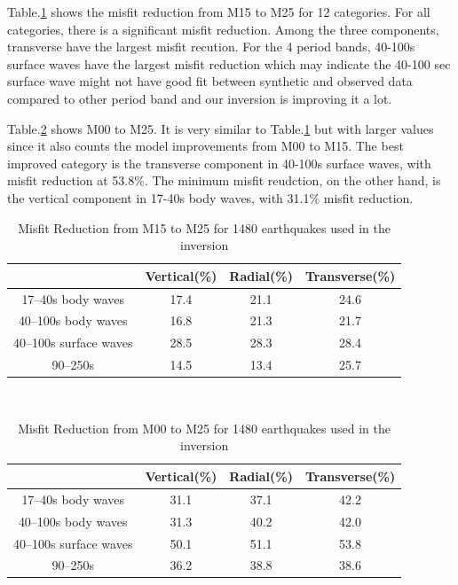 \documentclass[extra,mreferee]{gji}
\begin{document}
Table.\ref{table:misfit_reduction_M15_M25} shows the misfit reduction from M15 to M25
for 12 categories. For all categories, there is a significant misfit reduction. Among
the three components, transverse have the largest misfit recution. For the 4 period bands,
40-100s surface waves have the largest misfit reduction which may indicate the 40-100 sec
surface wave might not have good fit between synthetic and observed data compared to
other period band and our inversion is improving it a lot.

Table.\ref{table:misfit_reduction_M00_M25} shows M00 to M25. It is very similar to
Table.\ref{table:misfit_reduction_M15_M25} but with larger values since it also
counts the model improvements from M00 to M15. The best improved category is
the transverse component in 40-100s surface waves, with misfit reduction at
53.8\%. The minimum misfit reudction, on the other hand, is the vertical component
in 17-40s body waves, with 31.1\% misfit reduction.

\begin{table}[!htb]
  \centering
  \begin{tabular}{|c|c|c|c|}
    \hline
    ~          &  Vertical(\%) & Radial(\%) &  Transverse(\%) \\
    \hline
    17--40s  body waves    &   17.4   &       21.1 &       24.6 \\
    40--100s body waves    &   16.8   &       21.3 &       21.7 \\
    40--100s surface waves &   28.5   &       28.3 &       28.4 \\
    90--250s               &   14.5   &       13.4 &       25.7 \\
    \hline
  \end{tabular}\\
  \caption{Misfit Reduction from M15 to M25 for 1480 earthquakes used in the inversion}
  \label{table:misfit_reduction_M15_M25}
\end{table}

\begin{table}[!htb]
  \centering
  \begin{tabular}{|c|c|c|c|}
    \hline
     ~          &  Vertical(\%) & Radial(\%) &  Transverse(\%) \\
    \hline
    17--40s body waves     &    31.1    &       37.1 &       42.2 \\
    40--100s body waves    &    31.3    &       40.2 &       42.0 \\
    40--100s surface waves &    50.1    &       51.1 &       53.8 \\
    90--250s               &    36.2    &       38.8 &       38.6 \\
    \hline
  \end{tabular}\\
  \caption{Misfit Reduction from M00 to M25 for 1480 earthquakes used in the inversion}
  \label{table:misfit_reduction_M00_M25}
\end{table}
\end{document}
